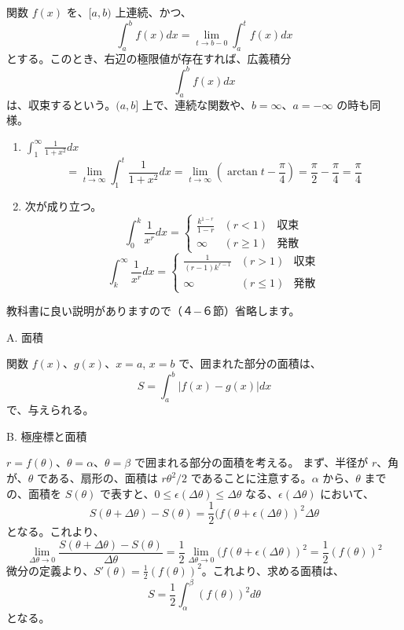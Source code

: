 \newpage{}
\begin{definition}
関数 $f(x)$ を、$[a,b)$ 上連続、かつ、
$$\int_a^bf(x)dx = \lim_{t\to b-0}\int^t_af(x)dx$$
とする。このとき、右辺の極限値が存在すれば、広義積分
$$\int_a^bf(x)dx$$
は、収束するという。$(a,b]$ 上で、連続な関数や、$b = \infty$、$a = -\infty$ の時も同様。
\end{definition}

\begin{eg}
\begin{enumerate}
\item ${\displaystyle \int_1^\infty\frac{1}{1+x^2}dx }$
$$= \lim_{t\to\infty}\int^t_1\frac{1}{1+x^2}dx = \lim_{t\to\infty}(\arctan t - \frac{\pi}{4}) = \frac{\pi}{2} - \frac{\pi}{4} = \frac{\pi}{4}$$
\item 次が成り立つ。
$$\int_0^k\frac{1}{x^r}dx = \left\{\begin{array}{lll}
\frac{k^{1-r}}{1-r} & (r<1) & \mbox{収束}\\
\infty & (r\geq 1) & \mbox{発散}\end{array}
\right.$$
$$\int_k^\infty\frac{1}{x^r}dx = \left\{\begin{array}{lll}
\frac{1}{(r-1)k^{r-1}} & (r>1) & \mbox{収束}\\
\infty & (r\leq 1) & \mbox{発散}\end{array}
\right.$$
\end{enumerate}
\end{eg}

教科書に良い説明がありますので（４−６節）省略します。

\newpage{}
A. 面積

関数 $f(x)$、$g(x)$、$x = a$, $x = b$ で、囲まれた部分の面積は、
$$S = \int_a^b |f(x) - g(x)|dx$$
で、与えられる。

\bigskip
B. 極座標と面積

$r = f(\theta)$、$\theta = \alpha$、$\theta = \beta$ で囲まれる部分の面積を考える。
まず、半径が $r$、角が、$\theta$ である、扇形の、面積は $r\theta^2/2$ であることに注意する。$\alpha$ から、$\theta$ までの、面積を $S(\theta)$ で表すと、$0\leq \epsilon(\Delta\theta)\leq \Delta\theta$ なる、$\epsilon(\Delta\theta)$ において、
$$S(\theta+\Delta\theta) - S(\theta) = \frac{1}{2}(f(\theta + \epsilon(\Delta\theta))^2\Delta\theta$$
となる。これより、
$$\lim_{\Delta\theta\to 0}\frac{S(\theta+\Delta\theta) - S(\theta)}{\Delta\theta} = \frac12\lim_{\Delta\theta\to 0}(f(\theta + \epsilon(\Delta\theta))^2 = \frac12(f(\theta))^2$$
微分の定義より、$S'(\theta) = \frac12(f(\theta))^2$。これより、求める面積は、
$$S = \frac12\int_{\alpha}^{\beta}(f(\theta))^2d\theta$$
となる。

